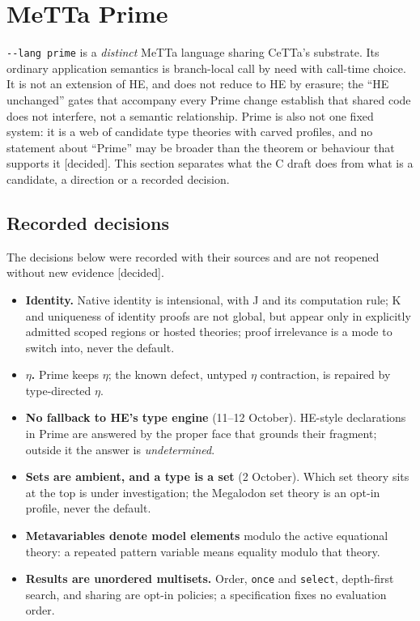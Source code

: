 \documentclass[11pt]{article}
\newcommand{\code}[1]{\texttt{#1}}
\newcommand{\kind}[1]{\textsf{\small[#1]}}
\newcommand{\HE}{\textup{HE}}
\newcommand{\CeTTa}{\textup{CeTTa}}
\begin{document}
\section{MeTTa Prime}
\label{sec:prime}

\code{-{}-lang prime} is a \emph{distinct} MeTTa language sharing \CeTTa{}'s
substrate.  Its ordinary application semantics is branch-local call by need
with call-time choice.  It is not an extension of \HE{}, and does not reduce to
\HE{} by erasure; the ``\HE{} unchanged'' gates that accompany every Prime
change establish that shared code does not interfere, not a semantic
relationship.  Prime is also not one fixed system: it is a web of candidate
type theories with carved profiles, and no statement about ``Prime'' may be
broader than the theorem or behaviour that supports it \kind{decided}.  This
section separates what the C draft does from what is a candidate, a direction
or a recorded decision.

\subsection{Recorded decisions}

The decisions below were recorded with their sources and are not reopened
without new evidence \kind{decided}.

\begin{itemize}
\item \textbf{Identity.} Native identity is intensional, with J and its
  computation rule; K and uniqueness of identity proofs are not global, but
  appear only in explicitly admitted scoped regions or hosted theories; proof
  irrelevance is a mode to switch into, never the default.
\item \textbf{$\eta$.} Prime keeps $\eta$; the known defect, untyped $\eta$
  contraction, is repaired by type-directed $\eta$.
\item \textbf{No fallback to \HE{}'s type engine} (11--12 October).  \HE{}-style
  declarations in Prime are answered by the proper face that grounds their
  fragment; outside it the answer is \emph{undetermined}.
\item \textbf{Sets are ambient, and a type is a set} (2 October).  Which set
  theory sits at the top is under investigation; the Megalodon set theory is
  an opt-in profile, never the default.
\item \textbf{Metavariables denote model elements} modulo the active equational
  theory: a repeated pattern variable means equality modulo that theory.
\item \textbf{Results are unordered multisets.} Order, \code{once} and
  \code{select}, depth-first search, and sharing are opt-in policies; a
  specification fixes no evaluation order.
\end{itemize}
\end{document}
